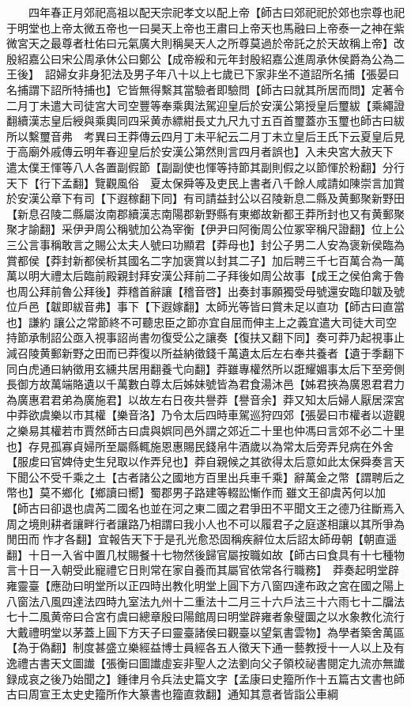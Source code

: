 　　四年春正月郊祀高祖以配天宗祀孝文以配上帝【師古曰郊祀祀於郊也宗尊也祀于明堂也上帝太微五帝也一曰昊天上帝也王肅曰上帝天也馬融曰上帝泰一之神在紫微宮天之最尊者杜佑曰元氣廣大則稱昊天人之所尊莫過於帝託之於天故稱上帝】改殷紹嘉公曰宋公周承休公曰鄭公【成帝綏和元年封殷紹嘉公進周承休侯爵為公為二王後】　詔婦女非身犯法及男子年八十以上七歲已下家非坐不道詔所名捕【張晏曰名捕謂下詔所特捕也】它皆無得繫其當驗者即驗問【師古曰就其所居而問】定著令　二月丁未遣大司徒宮大司空豐等奉乘輿法駕迎皇后於安漢公第授皇后璽紱【乘繩證翻續漢志皇后綬與乘輿同四采黄赤縹紺長丈九尺九寸五百首璽蓋亦玉璽也師古曰紱所以繫璽音弗　考異曰王莽傳云四月丁未平紀云二月丁未立皇后王氏下云夏皇后見于高廟外戚傳云明年春迎皇后於安漢公第然則言四月者誤也】入未央宮大赦天下　遣太僕王惲等八人各置副假節【副副使也惲等持節其副則假之以節惲於粉翻】分行天下【行下孟翻】覽觀風俗　夏太保舜等及吏民上書者八千餘人咸請如陳崇言加賞於安漢公章下有司【下遐稼翻下同】有司請益封公以召陵新息二縣及黄郵聚新野田【新息召陵二縣屬汝南郡續漢志南陽郡新野縣有東鄉故新都王莽所封也又有黄郵聚聚才諭翻】采伊尹周公稱號加公為宰衡【伊尹曰阿衡周公位冢宰稱尺證翻】位上公三公言事稱敢言之賜公太夫人號曰功顯君【莽母也】封公子男二人安為褒新侯臨為賞都侯【莽封新都侯析其國名二字加褒賞以封其二子】加后聘三千七百萬合為一萬萬以明大禮太后臨前殿親封拜安漢公拜前二子拜後如周公故事【成王之侯伯禽于魯也周公拜前魯公拜後】莽稽首辭讓【稽音啓】出奏封事願獨受母號還安臨印韍及號位戶邑【韍即紱音弗】事下【下遐嫁翻】太師光等皆曰賞未足以直功【師古曰直當也】謙約讓公之常節終不可聽忠臣之節亦宜自屈而伸主上之義宜遣大司徒大司空持節承制詔公亟入視事詔尚書勿復受公之讓奏【復扶又翻下同】奏可莽乃起視事止減召陵黄郵新野之田而已莽復以所益納徵錢千萬遺太后左右奉共養者【遺于季翻下同白虎通曰納徵用玄纁共居用翻養弋向翻】莽雖專權然所以誑耀媚事太后下至旁側長御方故萬端賂遺以千萬數白尊太后姊妹號皆為君食湯沐邑【姊君挾為廣恩君君力為廣惠君君弟為廣施君】以故左右日夜共譽莽【譽音余】莽又知太后婦人厭居深宮中莽欲虞樂以市其權【樂音洛】乃令太后四時車駕巡狩四郊【張晏曰市權者以遊觀之樂易其權若市賈然師古曰虞與娯同邑外謂之郊近二十里也仲馮曰言郊不必二十里也】存見孤寡貞婦所至屬縣輒施恩惠賜民錢帛牛酒歲以為常太后旁弄兒病在外舍【服䖍曰官婢侍史生兒取以作弄兒也】莽自親候之其欲得太后意如此太保舜奏言天下聞公不受千乘之土【古者諸公之國地方百里出兵車千乘】辭萬金之幣【謂聘后之幣也】莫不鄉化【鄉讀曰嚮】蜀郡男子路建等輟訟慚作而雖文王卻虞芮何以加【師古曰卻退也虞芮二國名也並在河之東二國之君爭田不平聞文王之德乃往斷焉入周之境則耕者讓畔行者讓路乃相謂曰我小人也不可以履君子之庭遂相讓以其所爭為閒田而怍才各翻】宜報告天下于是孔光愈恐固稱疾辭位太后詔太師毋朝【朝直遥翻】十日一入省中置几杖賜餐十七物然後歸官屬按職如故【師古曰食具有十七種物言十日一入朝受此寵禮它日則常在家自養而其屬官依常各行職務】　莽奏起明堂辟雍靈臺【應劭曰明堂所以正四時出教化明堂上圓下方八窗四達布政之宮在國之陽上八窗法八風四達法四時九室法九州十二重法十二月三十六戶法三十六雨七十二牖法七十二風黄帝曰合宮冇虞曰總章殷曰陽館周曰明堂辟雍者象璧圜之以水象教化流行大戴禮明堂以茅蓋上圓下方天子曰靈臺諸侯曰觀臺以望氣書雲物】為學者築舍萬區【為于偽翻】制度甚盛立樂經益博士員經各五人徵天下通一藝教授十一人以上及有逸禮古書天文圖䜟【張衡曰圖䜟虛妄非聖人之法劉向父子領校祕書閱定九流亦無䜟録成哀之後乃始聞之】鍾律月令兵法史篇文字【孟康曰史籀所作十五篇古文書也師古曰周宣王太史史籀所作大篆書也籀直救翻】通知其意者皆詣公車綱